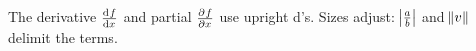\documentclass{article}
\begin{document}
The derivative $\od{f}{x}$ and partial $\pd{f}{x}$ use upright d's.
Sizes adjust: $\abs{\frac{a}{b}}$ and $\norm{v}$ delimit the terms.
\end{document}
